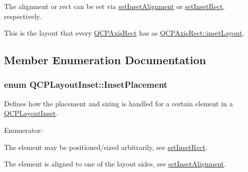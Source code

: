 \-The alignment or rect can be set via \hyperlink{classQCPLayoutInset_a62882a4f9ad58bb0f53da12fde022abe}{set\-Inset\-Alignment} or \hyperlink{classQCPLayoutInset_aa487c8378a6f9533567a2e6430099dc3}{set\-Inset\-Rect}, respectively.

\-This is the layout that every \hyperlink{classQCPAxisRect}{\-Q\-C\-P\-Axis\-Rect} has as \hyperlink{classQCPAxisRect_a4114887c7141b59650b7488f930993e5}{\-Q\-C\-P\-Axis\-Rect\-::inset\-Layout}. 

\subsection{\-Member \-Enumeration \-Documentation}
\hypertarget{classQCPLayoutInset_a8b9e17d9a2768293d2a7d72f5e298192}{
\subsubsection[{\-Inset\-Placement}]{\setlength{\rightskip}{0pt plus 5cm}enum {\bf \-Q\-C\-P\-Layout\-Inset\-::\-Inset\-Placement}}}\label{classQCPLayoutInset_a8b9e17d9a2768293d2a7d72f5e298192}
\-Defines how the placement and sizing is handled for a certain element in a \hyperlink{classQCPLayoutInset}{\-Q\-C\-P\-Layout\-Inset}. \begin{Desc}
\item[\-Enumerator\-: ]\par
\begin{description}
\item[{\em 
\hypertarget{classQCPLayoutInset_a8b9e17d9a2768293d2a7d72f5e298192aa4802986ea2cea457f932b115acba59e}{ip\-Free}\label{classQCPLayoutInset_a8b9e17d9a2768293d2a7d72f5e298192aa4802986ea2cea457f932b115acba59e}
}]\-The element may be positioned/sized arbitrarily, see \hyperlink{classQCPLayoutInset_aa487c8378a6f9533567a2e6430099dc3}{set\-Inset\-Rect}. \item[{\em 
\hypertarget{classQCPLayoutInset_a8b9e17d9a2768293d2a7d72f5e298192aa81e7df4a785ddee2229a8f47c46e817}{ip\-Border\-Aligned}\label{classQCPLayoutInset_a8b9e17d9a2768293d2a7d72f5e298192aa81e7df4a785ddee2229a8f47c46e817}
}]\-The element is aligned to one of the layout sides, see \hyperlink{classQCPLayoutInset_a62882a4f9ad58bb0f53da12fde022abe}{set\-Inset\-Alignment}. \end{description}
\end{Desc}



